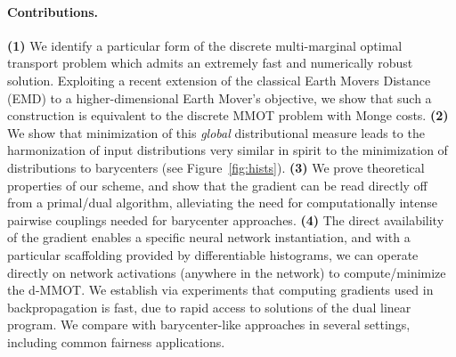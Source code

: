 \paragraph{Contributions.}  \textbf{(1)} We identify a particular form of the discrete multi-marginal optimal transport problem
which admits an extremely fast and numerically robust solution.
Exploiting a recent extension of 
the classical Earth Movers Distance (EMD) to a higher-dimensional Earth Mover's objective,
we show that such a construction is equivalent
to the discrete MMOT problem with Monge costs.
\textbf{(2)} We show that minimization of this \textit{global} distributional measure
leads to the 
harmonization of input distributions very similar in spirit to the minimization of distributions to barycenters (see Figure~\ref{fig:hists}).
\textbf{(3)} We prove theoretical properties of our scheme, and show that 
the gradient can be read directly off from a primal/dual algorithm,
alleviating the need for 
computationally intense 
pairwise couplings needed for barycenter approaches.
\textbf{(4)} The direct availability of the gradient
enables a specific neural network instantiation,
and
with a particular scaffolding provided by differentiable histograms, 
we can operate directly on network activations (anywhere in the network) to compute/minimize the d-MMOT. 
We establish via experiments that computing gradients used in backpropagation is fast, due to rapid access to solutions of the dual linear program.
We compare with barycenter-like approaches in several settings, including common fairness applications.

